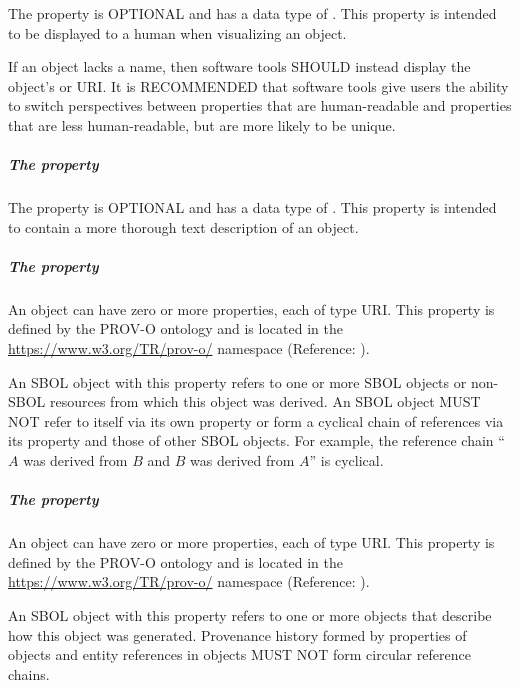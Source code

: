 The  property is OPTIONAL and has a data type of . This property is intended to be displayed to a human when visualizing an  object.

If an  object lacks a name, then software tools SHOULD instead display the object's  or URI.
It is RECOMMENDED that software tools give users the ability to switch perspectives between  properties that are human-readable and  properties that are less human-readable, but are more likely to be unique.

\subparagraph{The  property}
\label{sec:description}

The  property is OPTIONAL and has a data type of . This property is intended to contain a more thorough text description of an  object.

\subparagraph{The  property}
\label{sec:prov:wasDerivedFrom}
An  object can have zero or more  properties, each of type URI. This property is defined by the PROV-O ontology and is located in the \url{https://www.w3.org/TR/prov-o/} namespace (Reference: ).

 An SBOL object with this property refers to one or more SBOL objects or non-SBOL resources from which this object was derived. An SBOL object MUST NOT refer to itself via its own  property or form a cyclical chain of references via its  property and those of other SBOL objects. For example, the reference chain ``$A$ was derived from $B$ and $B$ was derived from $A$'' is cyclical.

\subparagraph{The  property}
\label{sec:prov:wasGeneratedBy}
An  object can have zero or more  properties, each of type URI. This property is defined by the PROV-O ontology and is located in the \url{https://www.w3.org/TR/prov-o/} namespace (Reference: ).

An SBOL object with this property refers to one or more  objects that describe how this object was generated.
Provenance history formed by  properties of  objects and entity references in  objects MUST NOT form circular reference chains.

